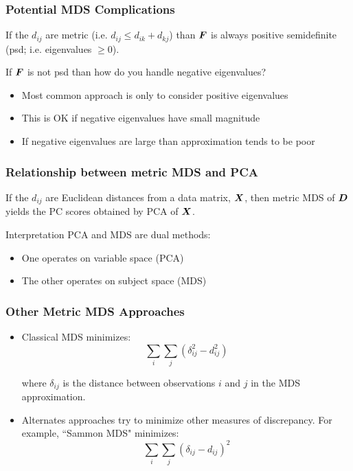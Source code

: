 \documentclass{beamer}
\begin{document}
\begin{frame}
  \frametitle{Potential MDS Complications}

If the $d_{ij}$ are metric (i.e. $d_{ij} \leq d_{ik} + d_{kj}$) than $\bm{F}$ is always positive semidefinite (psd; i.e. eigenvalues $\geq 0$).

\medskip
If $\bm{F}$ is not psd than how do you handle negative eigenvalues?

\begin{itemize}

\item Most common approach is only to consider positive eigenvalues
\item This is OK if negative eigenvalues have small magnitude
\item If negative eigenvalues are large than approximation tends to be poor

\end{itemize}


\end{frame}


\begin{frame}
  \frametitle{Relationship between metric MDS and PCA}

 If the $d_{ij}$ are Euclidean distances from a data matrix, $\bm{X}$, then metric MDS of $\bm{D}$ yields the PC scores obtained by PCA of $\bm{X}$.

 \medskip
  \begin{block}{Interpretation}
PCA and MDS are dual methods:
\begin{itemize}
  \item One operates on variable space (PCA)
  \item The other operates on subject space (MDS)
\end{itemize}
\end{block}

\end{frame}

\begin{frame}
  \frametitle{Other Metric MDS Approaches}

\begin{itemize}
\item Classical MDS minimizes:
\[
\sum_i \sum_j(\delta_{ij}^2 - d_{ij}^2)
\]

where $\delta_{ij}$ is the distance between observations $i$ and $j$ in the MDS approximation.

\item Alternates approaches try to minimize other measures of discrepancy. For example, ``Sammon MDS" minimizes:
\[
\sum_i \sum_j (\delta_{ij} - d_{ij})^2
\]
\end{itemize}
\end{frame}
\end{document}
